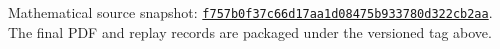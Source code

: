 \par\noindent\small Mathematical source snapshot: \href{https://github.com/Bome2017/bsd-seed-research/tree/f757b0f37c66d17aa1d08475b933780d322cb2aa}{\nolinkurl{f757b0f37c66d17aa1d08475b933780d322cb2aa}}. The final PDF and replay records are packaged under the versioned tag above.\normalsize
